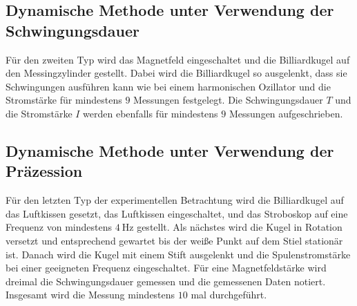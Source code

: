 \subsection{Dynamische Methode unter Verwendung der Schwingungsdauer}
Für den zweiten Typ wird das Magnetfeld eingeschaltet und die Billiardkugel auf den Messingzylinder gestellt. Dabei wird die Billiardkugel so ausgelenkt, dass sie Schwingungen ausführen kann wie bei einem harmonischen 
Ozillator und die Stromstärke für mindestens $9$ Messungen festgelegt. Die Schwingungsdauer $T$ und die Stromstärke $I$ werden ebenfalls für mindestens $9$ Messungen aufgeschrieben.

\subsection{Dynamische Methode unter Verwendung der Präzession}
Für den letzten Typ der experimentellen Betrachtung wird die Billiardkugel auf das Luftkissen gesetzt, das Luftkissen eingeschaltet, und das Stroboskop auf eine Frequenz von mindestens $\SI{4}{\Hz}$ gestellt. 
Als nächstes wird die Kugel in Rotation versetzt und entsprechend gewartet bis der weiße Punkt auf dem Stiel stationär ist. 
Danach wird die Kugel mit einem Stift ausgelenkt und die Spulenstromstärke bei einer geeigneten Frequenz eingeschaltet. Für eine Magnetfeldstärke wird dreimal die
Schwingungsdauer gemessen und die gemessenen Daten notiert. Insgesamt wird die Messung mindestens $10$ mal durchgeführt.
